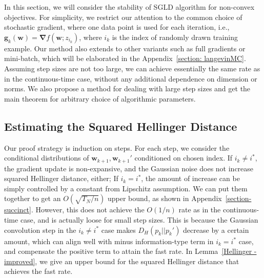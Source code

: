\documentclass[final,12pt]{colt2018} %
\newcommand{\mb}[1]{\mathbb{#1}}
\newcommand{\w}{\bm{w}}
\newcommand{\norm}[1]{\left\lVert#1\right\rVert}
\begin{document}
In this section, we will consider the stability of SGLD algorithm for non-convex objectives. For simplicity, we restrict our attention to the common choice of stochastic gradient, where one data point is used for each iteration, i.e., $\bm{g}_k(\bm{w})=\bm{\nabla}f(\bm{w};z_{i_k})$, where $i_k$ is the index of randomly drawn training example. Our method also extends to other variants such as full gradients or mini-batch, which will be elaborated in the Appendix~\ref{section: langevinMC}. Assuming step sizes are not too large, we can achieve essentially the same rate as in the continuous-time case, without any additional dependence on dimension or norms. We also propose a method for dealing with large step sizes and get the main theorem for arbitrary choice of algorithmic parameters.


\subsection{Estimating the Squared Hellinger Distance}
Our proof strategy is induction on steps. For each step, we consider the conditional distributions of $\w_{k+1},\w_{k+1}'$ conditioned on chosen index. If $i_k\neq i^*$, the gradient update is non-expansive, and the Gaussian noise does not increase squared Hellinger distance, either; If $i_k=i^*$, the amount of increase can be simply controlled by a constant from Lipschitz assumption. We can put them together to get an $O(\sqrt{T_N/n})$ upper bound, as shown in Appendix~\ref{section-succinct}. However, this does not achieve the $O(1/n)$ rate as in the continuous-time case, and is actually loose for small step sizes. This is because the Gaussian convolution step in the $i_k\neq i^*$ case makes $D_H(p_k||p_k')$ decrease by a certain amount, which can align well with minus information-type term in $i_k=i^*$ case, and compensate the positive term to attain the fast rate. In Lemma~\ref{Hellinger - improved}, we give an upper bound for the squared Hellinger distance that achieves the fast rate.
\end{document}
